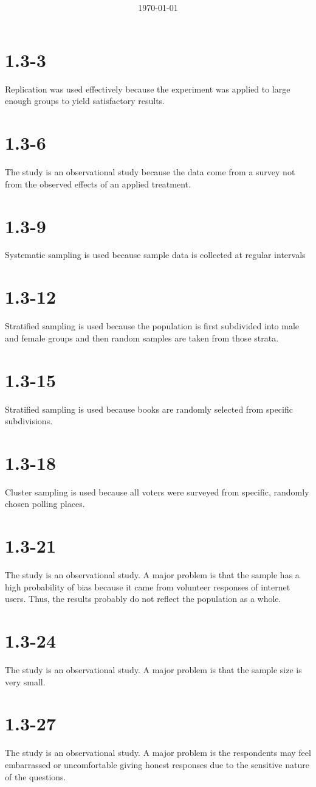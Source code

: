 \documentclass{article}
\title{\classdescription\ \\ \classname\ \\ $\ $ \\ \assignment}
\author{\authorname}
\date{\today}
\newcommand{\chapter}{1.3}
\newcommand{\problem}[1]{\vspace{5ex}\section*{\chapter-#1}}
\begin{document}
\maketitle


\problem{3}
Replication was used effectively because the experiment was applied to large enough groups to yield satisfactory results.


\problem{6}
The study is an observational study because the data come from a survey not from the observed effects of an applied treatment.


\problem{9}
Systematic sampling is used because sample data is collected at regular intervals


\problem{12}
Stratified sampling is used because the population is first subdivided into male and female groups and then random samples are taken from those strata.


\problem{15}
Stratified sampling is used because books are randomly selected from specific subdivisions.


\problem{18}
Cluster sampling is used because all voters were surveyed from specific, randomly chosen polling places.


\problem{21}
The study is an observational study. A major problem is that the sample has a high probability of bias because it came from volunteer responses of internet users. Thus, the results probably do not reflect the population as a whole.


\problem{24}
The study is an observational study. A major problem is that the sample size is very small.


\problem{27}
The study is an observational study. A major problem is the respondents may feel embarrassed or uncomfortable giving honest responses due to the sensitive nature of the questions.
\end{document}

